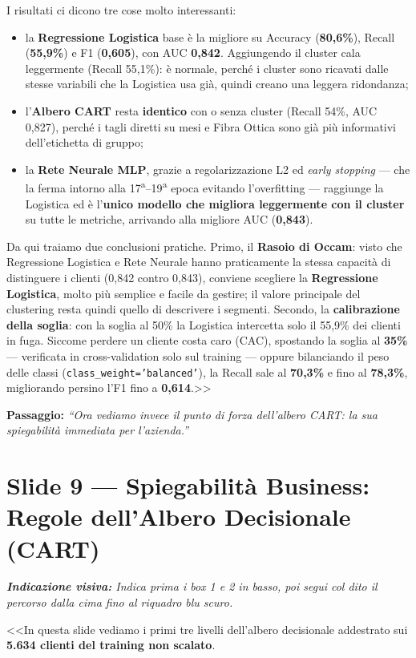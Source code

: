 \documentclass[10pt, a4paper]{article}
\newcommand{\cue}[1]{%
  \par\vspace{1pt}\noindent\colorbox{CueBg}{\parbox{\dimexpr\linewidth-2\fboxsep}{\footnotesize\textit{\color{PrimaryNavy}\textbf{Indicazione visiva:} #1}}}\par\vspace{2pt}%
}
\newcommand{\transition}[1]{%
  \par\vspace{1pt}\noindent\colorbox{LightBg}{\parbox{\dimexpr\linewidth-2\fboxsep}{\small\textbf{\color{SecondaryBlue}Passaggio:} \textit{``#1''}}}\par\vspace{2pt}%
}
\begin{document}
I risultati ci dicono tre cose molto interessanti:
\begin{itemize}
    \item la \textbf{Regressione Logistica} base è la migliore su Accuracy (\textbf{80,6\%}), Recall (\textbf{55,9\%}) e F1 (\textbf{0,605}), con AUC \textbf{0,842}. Aggiungendo il cluster cala leggermente (Recall 55,1\%): è normale, perché i cluster sono ricavati dalle stesse variabili che la Logistica usa già, quindi creano una leggera ridondanza;
    \item l'\textbf{Albero CART} resta \textbf{identico} con o senza cluster (Recall 54\%, AUC 0,827), perché i tagli diretti su mesi e Fibra Ottica sono già più informativi dell'etichetta di gruppo;
    \item la \textbf{Rete Neurale MLP}, grazie a regolarizzazione L2 ed \textit{early stopping} --- che la ferma intorno alla 17\textsuperscript{a}--19\textsuperscript{a} epoca evitando l'overfitting --- raggiunge la Logistica ed è l'\textbf{unico modello che migliora leggermente con il cluster} su tutte le metriche, arrivando alla migliore AUC (\textbf{0,843}).
\end{itemize}
Da qui traiamo due conclusioni pratiche. Primo, il \textbf{Rasoio di Occam}: visto che Regressione Logistica e Rete Neurale hanno praticamente la stessa capacità di distinguere i clienti (0,842 contro 0,843), conviene scegliere la \textbf{Regressione Logistica}, molto più semplice e facile da gestire; il valore principale del clustering resta quindi quello di descrivere i segmenti. Secondo, la \textbf{calibrazione della soglia}: con la soglia al 50\% la Logistica intercetta solo il 55,9\% dei clienti in fuga. Siccome perdere un cliente costa caro (CAC), spostando la soglia al \textbf{35\%} --- verificata in cross-validation solo sul training --- oppure bilanciando il peso delle classi (\texttt{class\_weight='balanced'}), la Recall sale al \textbf{70,3\%} e fino al \textbf{78,3\%}, migliorando persino l'F1 fino a \textbf{0,614}.>>
\transition{Ora vediamo invece il punto di forza dell'albero CART: la sua spiegabilità immediata per l'azienda.}

\section*{Slide 9 --- Spiegabilità Business: Regole dell'Albero Decisionale (CART)}
\cue{Indica prima i box 1 e 2 in basso, poi segui col dito il percorso dalla cima fino al riquadro blu scuro.}
\noindent <<In questa slide vediamo i primi tre livelli dell'albero decisionale addestrato sui \textbf{5.634 clienti del training non scalato}.
\end{document}

